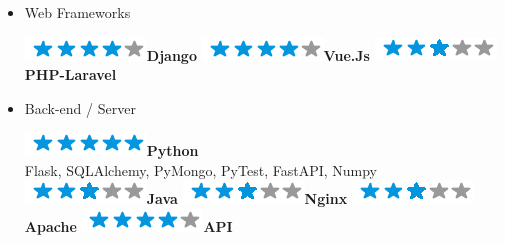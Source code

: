 \documentclass[]{friggeri-cv}
\begin{document}
\begin{flushleft}
\begin{multicols}{3}
\begin{itemize}
\item \large Web Frameworks \
\normalsize
\begin{flushleft}

\includegraphics[scale=0.40]{res/img/4stars.png}\hspace{1.5mm}\textbf{Django}
\includegraphics[scale=0.40]{res/img/4stars.png}\hspace{1.5mm}\textbf{Vue.Js}
\includegraphics[scale=0.40]{res/img/3stars.png}\hspace{1.5mm}\textbf{PHP-Laravel}
\end{flushleft}            

\columnbreak
\item \large Back-end / Server \
\normalsize
\begin{flushleft}

\includegraphics[scale=0.40]{res/img/5stars.png}\hspace{1.5mm}\textbf{Python}\\Flask, SQLAlchemy, PyMongo, PyTest, FastAPI, Numpy\\\vspace{2mm}
\includegraphics[scale=0.40]{res/img/3stars.png}\hspace{1.5mm}\textbf{Java}
\includegraphics[scale=0.40]{res/img/3stars.png}\hspace{1.5mm}\textbf{Nginx}
\includegraphics[scale=0.40]{res/img/3stars.png}\hspace{1.5mm}\textbf{Apache}
\includegraphics[scale=0.40]{res/img/4stars.png}\hspace{1.5mm}\textbf{API}
\end{flushleft}            


\end{itemize}
\end{multicols}
\end{flushleft}
\end{document}

